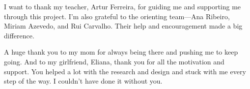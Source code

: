\acknowledgements

I want to thank my teacher, Artur Ferreira, for guiding me and supporting me through this project. I’m also grateful to the orienting team—Ana Ribeiro, Miriam Azevedo, and Rui Carvalho. Their help and encouragement made a big difference.

A huge thank you to my mom for always being there and pushing me to keep going. And to my girlfriend, Eliana, thank you for all the motivation and support. You helped a lot with the research and design and stuck with me every step of the way. I couldn’t have done it without you.